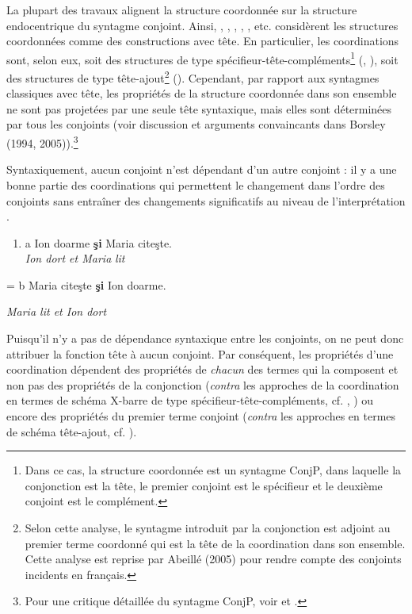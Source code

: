 La plupart des travaux alignent la structure coordonnée sur la structure endocentrique du syntagme conjoint. Ainsi, \citet{Munn1993}, \citet{Kayne1994}, \citet{Johannessen1998}, \citet{Camacho2003}, \citet{Rebuschi2005}, etc. considèrent les structures coordonnées comme des constructions avec tête. En particulier, les coordinations sont, selon eux, soit des structures de type spécifieur-tête-compléments\footnote{Dans ce cas, la structure coordonnée est un syntagme ConjP, dans laquelle la conjonction est la tête, le premier conjoint est le spécifieur et le deuxième conjoint est le complément.} (\citet{Kayne1994}, \citet{Johannessen1998}), soit des structures de type tête-ajout\footnote{Selon cette analyse, le syntagme introduit par la conjonction est adjoint au premier terme coordonné qui est la tête de la coordination dans son ensemble. Cette analyse est reprise par Abeillé (2005) pour rendre compte des conjoints incidents en français.} (\citet{Munn1993}). Cependant, par rapport aux syntagmes classiques avec tête, les propriétés de la structure coordonnée dans son ensemble ne sont pas projetées par une seule tête syntaxique, mais elles sont déterminées par tous les conjoints (voir discussion et arguments convaincants dans Borsley (1994, 2005)).\footnote{Pour une critique détaillée du syntagme ConjP, voir \citet{Chaves2007} et \citet{Mouret2007}.} 

Syntaxiquement, aucun conjoint n'est dépendant d'un autre conjoint : il y a une bonne partie des coordinations qui permettent le changement dans l'ordre des conjoints sans entraîner des changements significatifs au niveau de l'interprétation .


\begin{enumerate}
\item \label{bkm:Ref301799373}\label{bkm:Ref301797712}a  Ion doarme \textbf{şi} Maria citeşte.  \\
\textit{Ion dort et Maria} \textit{lit}


\end{enumerate}
=  b  Maria citeşte \textbf{şi} Ion doarme.

    \textit{Maria lit et Ion dort}

Puisqu'il n'y a pas de dépendance syntaxique entre les conjoints, on ne peut donc attribuer la fonction tête à aucun conjoint. Par conséquent, les propriétés d'une coordination dépendent des propriétés de \textit{chacun} des termes qui la composent et non pas des propriétés de la conjonction (\textit{contra} les approches de la coordination en termes de schéma X-barre de type spécifieur-tête-compléments, cf. \citet{Kayne1994}, \citet{Johannessen1998}) ou encore des propriétés du premier terme conjoint (\textit{contra} les approches en termes de schéma tête-ajout, cf. \citet{Munn1993}).

